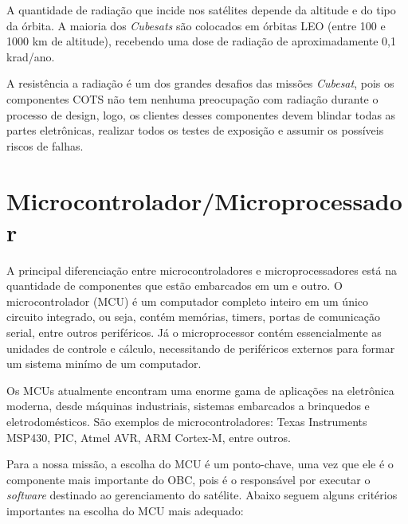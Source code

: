 A quantidade de radiação que incide nos satélites depende da altitude e do tipo da órbita. A maioria dos \textit{Cubesats} são colocados em órbitas LEO (entre 100 e 1000 km de altitude), recebendo uma dose de radiação de  aproximadamente 0,1 krad/ano.

A resistência a radiação é um dos grandes desafios das missões \textit{Cubesat}, pois os componentes COTS não tem nenhuma preocupação com radiação durante o processo de design, logo, os clientes desses componentes devem blindar todas as partes eletrônicas, realizar todos os testes de exposição e assumir os possíveis riscos de falhas.

\section{Microcontrolador/Microprocessador}\label{mcu_revision}
A principal diferenciação entre microcontroladores e microprocessadores está na quantidade de componentes que estão embarcados em um e outro. O microcontrolador (MCU) é um computador completo inteiro em um único circuito integrado, ou seja, contém memórias, timers, portas de comunicação serial, entre outros periféricos. Já o microprocessor contém essencialmente as unidades de controle e cálculo, necessitando de periféricos externos para formar um sistema minímo de um computador.

Os MCUs atualmente encontram uma enorme gama de aplicações na eletrônica moderna, desde máquinas industriais, sistemas embarcados a brinquedos e eletrodomésticos. São exemplos de microcontroladores: Texas Instruments MSP430, PIC, Atmel AVR, ARM Cortex-M, entre outros.

Para a nossa missão, a escolha do MCU é um ponto-chave, uma vez que ele é o componente mais importante do OBC, pois é o responsável por executar o \textit{software} destinado ao gerenciamento do satélite. Abaixo seguem alguns critérios importantes na escolha do MCU mais adequado:

